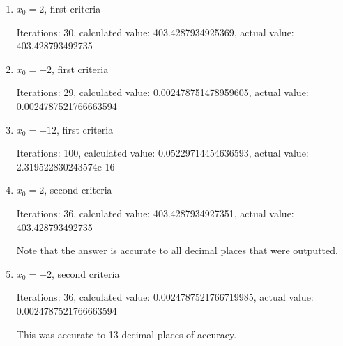 \documentclass[12pt]{article}
\begin{document}
\begin{enumerate}

\item $x_0=2$, first criteria

\begin{footnotesize}
\begin{spacing}{-.8}
Iterations: 30, calculated value: 403.4287934925369, actual value: 403.428793492735
\end{spacing}
\end{footnotesize}

\item $x_0=-2$, first criteria

\begin{footnotesize}
\begin{spacing}{-.8}
Iterations: 29, calculated value: 0.002478751478959605, actual value: 0.0024787521766663594
\end{spacing}
\end{footnotesize}

\item $x_0=-12$, first criteria

\begin{footnotesize}
\begin{spacing}{-.8}
Iterations: 100, calculated value: 0.05229714454636593, actual value: 2.319522830243574e-16
\end{spacing}
\end{footnotesize}

\item $x_0=2$, second criteria

\begin{footnotesize}
\begin{spacing}{-.8}
Iterations: 36, calculated value: 403.4287934927351, actual value: 403.428793492735
\end{spacing}
\end{footnotesize}
\vspace{.25in}
Note that the answer is accurate to all decimal places that were outputted.

\item $x_0=-2$, second criteria

\begin{footnotesize}
\begin{spacing}{-.8}
Iterations: 36, calculated value: 0.0024787521766719985, actual value: 0.0024787521766663594
\end{spacing}
\end{footnotesize}
\vspace{.25in}
This was accurate to 13 decimal places of accuracy.


\end{enumerate}
\end{document}
